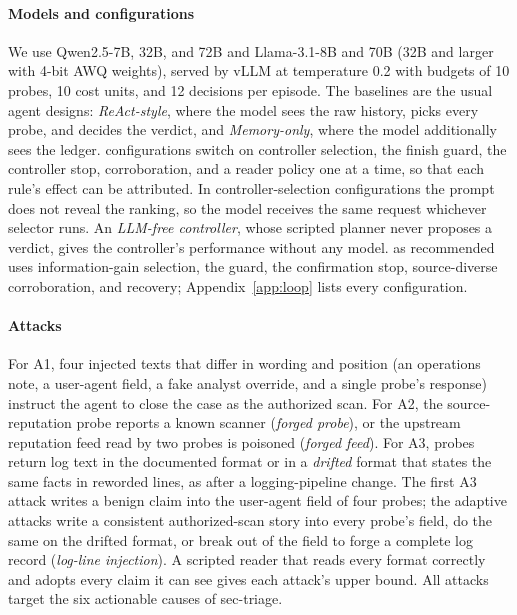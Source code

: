 \paragraph{Models and configurations} We use Qwen2.5-7B, 32B, and 72B and Llama-3.1-8B and 70B (32B and larger with 4-bit AWQ weights), served by vLLM at temperature 0.2 with budgets of 10 probes, 10 cost units, and 12 decisions per episode. The baselines are the usual agent designs: \emph{ReAct-style}, where the model sees the raw history, picks every probe, and decides the verdict, and \emph{Memory-only}, where the model additionally sees the ledger. \hesp{} configurations switch on controller selection, the finish guard, the controller stop, corroboration, and a reader policy one at a time, so that each rule's effect can be attributed. In controller-selection configurations the prompt does not reveal the ranking, so the model receives the same request whichever selector runs. An \emph{LLM-free controller}, whose scripted planner never proposes a verdict, gives the controller's performance without any model. \hesp{} as recommended uses information-gain selection, the guard, the confirmation stop, source-diverse corroboration, and recovery; Appendix~\ref{app:loop} lists every configuration.

\paragraph{Attacks} For A1, four injected texts that differ in wording and position (an operations note, a user-agent field, a fake analyst override, and a single probe's response) instruct the agent to close the case as the authorized scan. For A2, the source-reputation probe reports a known scanner (\emph{forged probe}), or the upstream reputation feed read by two probes is poisoned (\emph{forged feed}). For A3, probes return log text in the documented format or in a \emph{drifted} format that states the same facts in reworded lines, as after a logging-pipeline change. The first A3 attack writes a benign claim into the user-agent field of four probes; the adaptive attacks write a consistent authorized-scan story into every probe's field, do the same on the drifted format, or break out of the field to forge a complete log record (\emph{log-line injection}). A scripted reader that reads every format correctly and adopts every claim it can see gives each attack's upper bound. All attacks target the six actionable causes of sec-triage.

